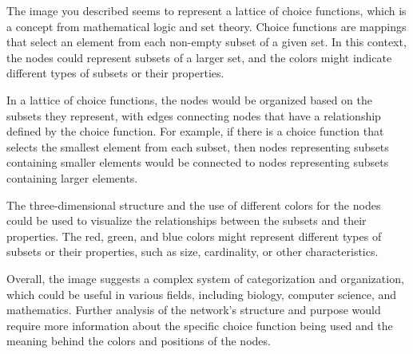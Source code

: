The image you described seems to represent a lattice of choice functions, which is a concept from mathematical logic and set theory. Choice functions are mappings that select an element from each non-empty subset of a given set. In this context, the nodes could represent subsets of a larger set, and the colors might indicate different types of subsets or their properties.

In a lattice of choice functions, the nodes would be organized based on the subsets they represent, with edges connecting nodes that have a relationship defined by the choice function. For example, if there is a choice function that selects the smallest element from each subset, then nodes representing subsets containing smaller elements would be connected to nodes representing subsets containing larger elements.

The three-dimensional structure and the use of different colors for the nodes could be used to visualize the relationships between the subsets and their properties. The red, green, and blue colors might represent different types of subsets or their properties, such as size, cardinality, or other characteristics.

Overall, the image suggests a complex system of categorization and organization, which could be useful in various fields, including biology, computer science, and mathematics. Further analysis of the network's structure and purpose would require more information about the specific choice function being used and the meaning behind the colors and positions of the nodes.